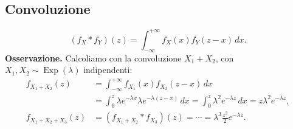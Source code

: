 \subsection*{Convoluzione}
\[ (f_X*f_Y)(z)=\int_{-\infty}^{+\infty}f_X(x)f_Y(z-x)\,dx. \]
\textbf{Osservazione.} Calcoliamo con la convoluzione $X_1+X_2$, con $X_1,X_2\sim\operatorname{Exp}(\lambda)$ indipendenti:
\begin{align*}
f_{X_1+X_2}(z)&=\int_{-\infty}^{+\infty}f_{X_1}(x)f_{X_2}(z-x)\,dx\\
&=\int_0^z\lambda e^{-\lambda x}\lambda e^{-\lambda(z-x)}\,dx
=\int_0^z\lambda^2e^{-\lambda z}\,dx=z\lambda^2e^{-\lambda z},\\
f_{X_1+X_2+X_3}(z)&=(f_{X_1+X_2}*f_{X_3})(z)=\cdots=\lambda^3\frac{z^2}{2}e^{-\lambda z}.
\end{align*}
